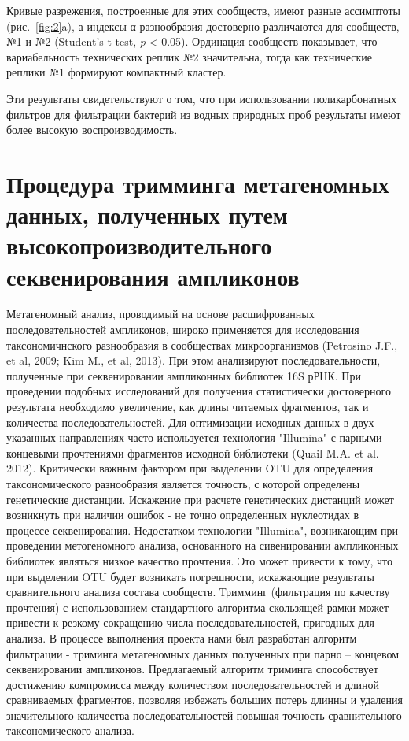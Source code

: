 \documentclass[a4paper,12pt,openany,final]{extreport}
\begin{document}
Кривые разрежения, построенные для этих сообществ, имеют разные
ассимптоты (рис.~\ref{fig:2}a), а индексы α-разнообразия достоверно различаются
для сообществ, №1 и №2 (Student's t-test, \emph{p} \textless{} 0.05).
Ординация сообществ показывает, что вариабельность технических реплик №2
значительна, тогда как технические реплики №1 формируют компактный
кластер.

Эти результаты свидетельствуют о том, что при использовании
поликарбонатных фильтров для фильтрации бактерий из водных природных
проб результаты имеют более высокую воспроизводимость.

\chapter{Процедура тримминга метагеномных данных, полученных путем высокопроизводительного секвенирования ампликонов}\label{chap:2}

Метагеномный анализ, проводимый на основе
расшифрованных последовательностей ампликонов, широко применяется для
исследования таксономичнского разнообразия в сообществах микроорганизмов
(Petrosino J.F., et al, 2009; Kim M., et al, 2013). При этом анализируют
последовательности, полученные при секвенировании ампликонных библиотек
16S рРНК. При проведении подобных исследований для получения
статистически достоверного результата необходимо увеличение, как длины
читаемых фрагментов, так и количества последовательностей. Для
оптимизации исходных данных в двух указанных направлениях часто
используется технология "Illumina" с парными концевыми прочтениями
фрагментов исходной библиотеки (Quail M.A. et al. 2012). Критически
важным фактором при выделении OTU для определения таксономического
разнообразия является точность, с которой определены генетические
дистанции. Искажение при расчете генетических дистанций может возникнуть
при наличии ошибок - не точно определенных нуклеотидах в процессе
секвенирования. Недостатком технологии "Illumina", возникающим при
проведении метогеномного анализа, основанного на сивенировании
ампликонных библиотек являться низкое качество прочтения. Это может
привести к тому, что при выделении OTU будет возникать погрешности,
искажающие результаты сравнительного анализа состава сообществ. Тримминг
(фильтрация по качеству прочтения) с использованием стандартного
алгоритма скользящей рамки может привести к резкому сокращению числа
последовательностей, пригодных для анализа. В процессе выполнения
проекта нами был разработан алгоритм фильтрации - триминга метагеномных
данных полученных при парно -- концевом секвенировании ампликонов.
Предлагаемый алгоритм триминга способствует достижению компромисса между
количеством последовательностей и длиной сравниваемых фрагментов,
позволяя избежать больших потерь длинны и удаления значительного
количества последовательностей повышая точность сравнительного
таксономического анализа.
\end{document}
